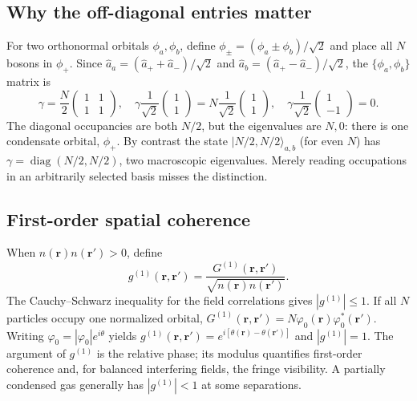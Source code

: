\subsection*{Why the off-diagonal entries matter}
For two orthonormal orbitals $\phi_a,\phi_b$, define
$\phi_\pm=(\phi_a\pm\phi_b)/\sqrt2$ and place all $N$ bosons in $\phi_+$. Since
$\hat a_a=(\hat a_++\hat a_-)/\sqrt2$ and
$\hat a_b=(\hat a_+-\hat a_-)/\sqrt2$, the $\{\phi_a,\phi_b\}$ matrix is
\[
\gamma=\frac N2\begin{pmatrix}1&1\\1&1\end{pmatrix},
\quad
\gamma\frac1{\sqrt2}\begin{pmatrix}1\\1\end{pmatrix}
=N\frac1{\sqrt2}\begin{pmatrix}1\\1\end{pmatrix},
\quad
\gamma\frac1{\sqrt2}\begin{pmatrix}1\\-1\end{pmatrix}=0.
\]
The diagonal occupancies are both $N/2$, but the eigenvalues are $N,0$: there is one condensate orbital, $\phi_+$. By contrast the state
$|N/2,N/2\rangle_{a,b}$ (for even $N$) has
$\gamma=\operatorname{diag}(N/2,N/2)$, two macroscopic eigenvalues. Merely reading occupations in an arbitrarily selected basis misses the distinction.

\subsection*{First-order spatial coherence}
When $n(\mathbf r)n(\mathbf r')>0$, define
\[
g^{(1)}(\mathbf r,\mathbf r')
=\frac{G^{(1)}(\mathbf r,\mathbf r')}
{\sqrt{n(\mathbf r)n(\mathbf r')}}.
\]
The Cauchy--Schwarz inequality for the field correlations gives
$|g^{(1)}|\leq1$. If all $N$ particles occupy one normalized orbital,
$G^{(1)}(\mathbf r,\mathbf r')=N\varphi_0(\mathbf r)\varphi_0^*(\mathbf r')$.
Writing $\varphi_0=|\varphi_0|e^{i\theta}$ yields
$g^{(1)}(\mathbf r,\mathbf r')=e^{i[\theta(\mathbf r)-\theta(\mathbf r')]}$
and $|g^{(1)}|=1$. The argument of $g^{(1)}$ is the relative phase; its modulus quantifies first-order coherence and, for balanced interfering fields, the fringe visibility. A partially condensed gas generally has $|g^{(1)}|<1$ at some separations.

